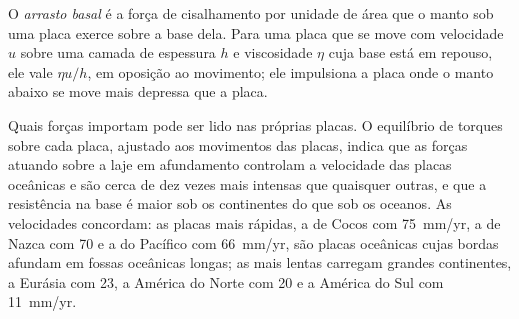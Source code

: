 \begin{omfigure}

\par{}\label{fig:b3:mantle-convection:ridge-push}
\end{omfigure}

\begin{definition}\label{def:b3:mantle-convection:basal-drag}
O \emph{arrasto basal} é a força de cisalhamento por unidade de área que o
manto sob uma placa exerce sobre a base dela. Para uma placa que se move com velocidade $u$
sobre uma camada de espessura $h$ e viscosidade $\eta$ cuja base está em repouso, ele vale
$\eta u/h$, em oposição ao movimento; ele impulsiona a placa onde o manto abaixo se move
mais depressa que a placa.
\end{definition}

Quais forças importam pode ser lido nas próprias placas. O equilíbrio de torques sobre
cada placa, ajustado aos movimentos das placas, indica que as forças atuando sobre a
laje em afundamento controlam a velocidade das placas oceânicas e são cerca de dez vezes
mais intensas que quaisquer outras, e que a resistência na base é maior sob os
continentes do que sob os oceanos. As velocidades concordam: as placas mais rápidas, a de Cocos com
\qty{75}{mm/yr}, a de Nazca com 70 e a do Pacífico com \qty{66}{mm/yr}, são placas oceânicas
cujas bordas afundam em fossas oceânicas longas; as mais lentas carregam grandes continentes,
a Eurásia com 23, a América do Norte com 20 e a América do Sul com \qty{11}{mm/yr}.

